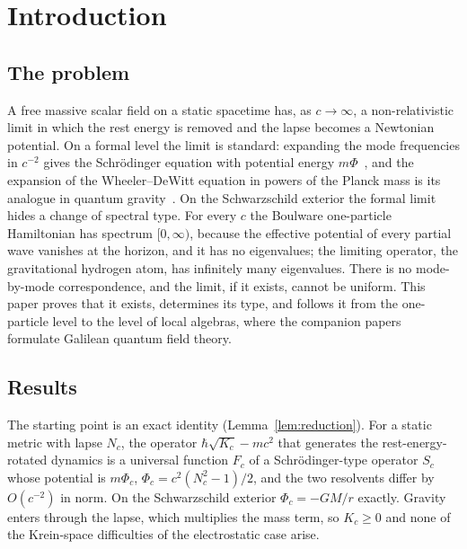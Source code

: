 \documentclass[%
 aip,
 jmp,
 amsmath,amssymb,
 reprint, onecolumn
]{revtex4-1}
\theoremstyle{definition}
\theoremstyle{remark}
\begin{document}
\maketitle

\section{Introduction}\label{sec:intro}

\subsection{The problem}

A free massive scalar field on a static spacetime has, as $c\to\infty$,
a non-relativistic limit in which the rest energy is removed and the
lapse becomes a Newtonian potential. On a formal level the limit is
standard: expanding the mode frequencies in $c^{-2}$ gives the
Schr\"odinger equation with potential energy $m\Phi$~\cite{Kuchar1980,
Lammerzahl1995,PadmanabhanPadmanabhan2011,
GiuliniGrossardt2012,SchwartzGiulini2019,HartongObersOling2023}, and the
expansion of the Wheeler--DeWitt equation in powers of the Planck mass
is its analogue in quantum gravity~\cite{KieferSingh1991}.
On the Schwarzschild exterior the formal limit hides a change of
spectral type. For every $c$ the Boulware one-particle Hamiltonian has
spectrum $[0,\infty)$, because the effective potential of every partial
wave vanishes at the horizon, and it has no eigenvalues; the limiting
operator, the gravitational hydrogen atom, has infinitely many
eigenvalues. There is
no mode-by-mode correspondence, and the limit, if it exists, cannot be
uniform. This paper proves that it exists, determines its type, and
follows it from the one-particle level to the level of local algebras,
where the companion
papers~\cite{pachon2026algebraicquantumkinematicssrselection,
pachon2026galileanreehschliederobstruction} formulate Galilean quantum
field theory.

\subsection{Results}

The starting point is an exact identity (Lemma~\ref{lem:reduction}).
For a static metric with lapse $N_c$, the operator $\hbar\sqrt{K_c}-
mc^2$ that generates the rest-energy-rotated dynamics is a universal
function $F_c$ of a Schr\"odinger-type operator $S_c$ whose potential
is $m\Phi_c$, $\Phi_c=c^2(N_c^2-1)/2$, and the two resolvents differ by
$O(c^{-2})$ in norm. On the Schwarzschild exterior $\Phi_c=-GM/r$
exactly. Gravity enters through the lapse, which multiplies the mass
term, so $K_c\geq0$ and none of the Krein-space difficulties of the
electrostatic case arise.
\end{document}
